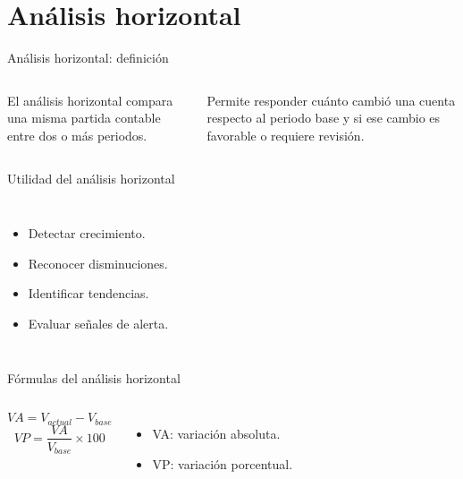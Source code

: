 \section{Análisis horizontal}

\begin{frame}{Análisis horizontal: definición}
  \begin{columns}[T,onlytextwidth]
    \footnotesize
    El análisis horizontal compara una misma partida contable entre dos o más periodos.

    \vspace{0.5em}
    Permite responder cuánto cambió una cuenta respecto al periodo base y si ese cambio es favorable o requiere revisión.
  \end{columns}
\end{frame}

\begin{frame}{Utilidad del análisis horizontal}
  \begin{columns}[T,onlytextwidth]
    \begin{itemize}
      \item Detectar crecimiento.
      \item Reconocer disminuciones.
      \item Identificar tendencias.
      \item Evaluar señales de alerta.
    \end{itemize}
  \end{columns}
\end{frame}

\begin{frame}{Fórmulas del análisis horizontal}
  \begin{columns}[T,onlytextwidth]
    \[
      VA = V_{actual} - V_{base}
    \]
    \[
      VP = \frac{VA}{V_{base}} \times 100
    \]
    \begin{itemize}
      \item VA: variación absoluta.
      \item VP: variación porcentual.
    \end{itemize}
  \end{columns}
\end{frame}

